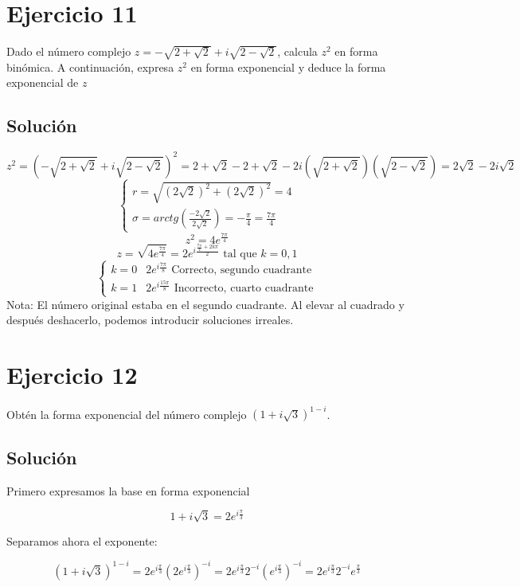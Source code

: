 \documentclass[fleqn]{article}
\begin{document}
 	\section{Ejercicio 11}
 	Dado el número complejo $z = -\sqrt{2+\sqrt{2}} + i\sqrt{2-\sqrt{2}}$, calcula $z^{2}$ en forma binómica. A continuación, expresa $z^{2}$ en forma exponencial y deduce la forma exponencial de $z$
 	\subsection{Solución}
 	 \[
 	 z^{2} = (-\sqrt{2+\sqrt{2}} + i\sqrt{2-\sqrt{2}})^{2} = 2 + \sqrt{2} - 2 + \sqrt{2} - 2i(\sqrt{2+\sqrt{2}})(\sqrt{2-\sqrt{2}}) = \boxed{2\sqrt{2} - 2i\sqrt{2}}
 	 \]
 	 \[
 	 \begin{cases}
 	 	r = \sqrt{(2\sqrt{2})^{2} + (2\sqrt{2})^{2}} = 4 \\
 	 	\sigma = arctg(\frac{-2\sqrt{2}}{2\sqrt{2}}) = -\frac{\pi}{4} = \frac{7\pi}{4}
 	 \end{cases}
 	 \]
 	 \[
 	 z^{2} = 4e^{\frac{7\pi}{4}}
 	 \]
 	 \[
 	 z = \sqrt{4e^{\frac{7\pi}{4}}} = 2e^{i\frac{\frac{7\pi}{4}+ 2k\pi}{2}} \text{ tal que } k = 0,1
 	 \]
 	 \[
 	 \begin{cases}
 	 	k = 0 & 2e^{i\frac{7\pi}{8}} \text{ Correcto, segundo cuadrante} \\
 	 	k = 1 & 2e^{i\frac{15\pi}{8}} \text{ Incorrecto, cuarto cuadrante}
 	 \end{cases}
 	 \]
 	 Nota: El número original estaba en el segundo cuadrante. Al elevar al cuadrado y después deshacerlo, podemos introducir soluciones irreales.


	\section{Ejercicio 12}
	Obtén la forma exponencial del número complejo $(1+i\sqrt{3})^{1-i}$.

	\subsection{Solución}

	Primero expresamos la base en forma exponencial

	\[
	1+i\sqrt{3}
	=
	2e^{i\frac{\pi}{3}}
	\]

	Separamos ahora el exponente:

	\[
	(1+i\sqrt{3})^{1-i}
	=
	2e^{i\frac{\pi}{3}}\left(2e^{i\frac{\pi}{3}}\right)^{-i}
	=
	2e^{i\frac{\pi}{3}} 2^{-i}\left(e^{i\frac{\pi}{3}}\right)^{-i}
	=
	2e^{i\frac{\pi}{3}} 2^{-i}e^{\frac{\pi}{3}}
	\]
\end{document}
